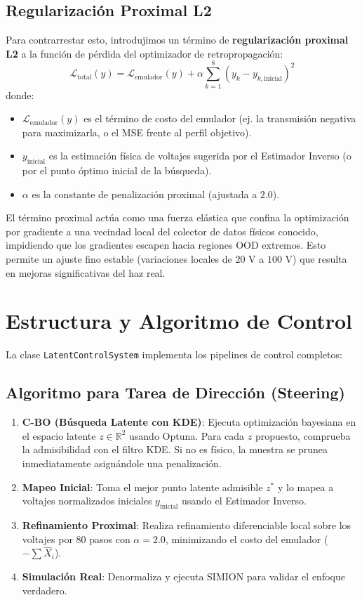 \documentclass[12pt,letterpaper]{article}
\begin{document}
\subsection{Regularización Proximal L2}
Para contrarrestar esto, introdujimos un término de \textbf{regularización proximal L2} a la función de pérdida del optimizador de retropropagación:
\begin{equation}
    \mathcal{L}_{\text{total}}(y) = \mathcal{L}_{\text{emulador}}(y) + \alpha \sum_{k=1}^8 \left( y_k - y_{k,\text{inicial}} \right)^2
\end{equation}
donde:
\begin{itemize}
    \item $\mathcal{L}_{\text{emulador}}(y)$ es el término de costo del emulador (ej. la transmisión negativa para maximizarla, o el MSE frente al perfil objetivo).
    \item $y_{\text{inicial}}$ es la estimación física de voltajes sugerida por el Estimador Inverso (o por el punto óptimo inicial de la búsqueda).
    \item $\alpha$ es la constante de penalización proximal (ajustada a $2.0$).
\end{itemize}
El término proximal actúa como una fuerza elástica que confina la optimización por gradiente a una vecindad local del colector de datos físicos conocido, impidiendo que los gradientes escapen hacia regiones OOD extremos. Esto permite un ajuste fino estable (variaciones locales de $20\text{ V}$ a $100\text{ V}$) que resulta en mejoras significativas del haz real.

\section{Estructura y Algoritmo de Control}
La clase \texttt{LatentControlSystem} implementa los pipelines de control completos:

\subsection{Algoritmo para Tarea de Dirección (Steering)}
\begin{enumerate}
    \item \textbf{C-BO (Búsqueda Latente con KDE)}: Ejecuta optimización bayesiana en el espacio latente $z \in \mathbb{R}^2$ usando Optuna. Para cada $z$ propuesto, comprueba la admisibilidad con el filtro KDE. Si no es físico, la muestra se prunea inmediatamente asignándole una penalización.
    \item \textbf{Mapeo Inicial}: Toma el mejor punto latente admisible $z^*$ y lo mapea a voltajes normalizados iniciales $y_{\text{inicial}}$ usando el Estimador Inverso.
    \item \textbf{Refinamiento Proximal}: Realiza refinamiento diferenciable local sobre los voltajes por 80 pasos con $\alpha = 2.0$, minimizando el costo del emulador ($-\sum \hat{X}_i$).
    \item \textbf{Simulación Real}: Denormaliza y ejecuta SIMION para validar el enfoque verdadero.
\end{enumerate}
\end{document}
